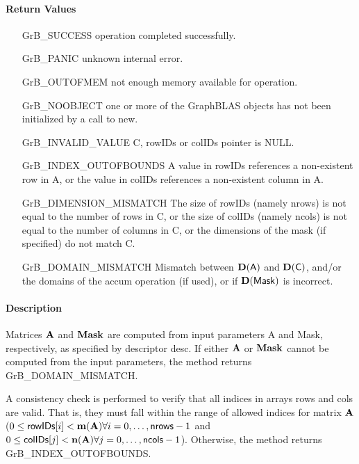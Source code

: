 \paragraph{Return Values}

\begin{itemize}[leftmargin=2.1in]
\item[{\sf GrB\_SUCCESS}]     operation completed successfully.
\item[{\sf GrB\_PANIC}]        unknown internal error.
\item[{\sf GrB\_OUTOFMEM}]    not enough memory available for operation.
\item[{\sf GrB\_NOOBJECT}]   one or more of the GraphBLAS objects has
                             not been initialized by a call to {\sf new}.
\item[{\sf GrB\_INVALID\_VALUE}]    {\sf C}, {\sf rowIDs} or {\sf colIDs} pointer is {\sf NULL}.

\item[{\sf GrB\_INDEX\_OUTOFBOUNDS}]
        A value in {\sf rowIDs} references a non-existent row in {\sf A}, or
        the value in {\sf colIDs} references a non-existent column in {\sf A}.
\item[{\sf GrB\_DIMENSION\_MISMATCH}] 
        The size of {\sf rowIDs} (namely {\sf nrows}) is not equal to the number of rows in {\sf C}, or
        the size of {\sf colIDs} (namely {\sf ncols}) is not equal to the number of columns in {\sf C}, or
        the dimensions of the mask (if specified) do not match {\sf C}.
\item[{\sf GrB\_DOMAIN\_MISMATCH}]    Mismatch between $\bold{D}({\sf A})$ and $\bold{D}({\sf C})$, 
                                      and/or the domains of the 
                                      {\sf accum} operation (if used), or if $\bold{D}(\sf Mask)$ is incorrect.
\end{itemize}


\paragraph{Description}

Matrices ${\bf A}$ and ${\bf Mask}$ are computed from input
parameters {\sf A} and {\sf Mask}, respectively, as specified by
descriptor {\sf desc}.  If either ${\bf A}$ or ${\bf Mask}$
cannot be computed from the input parameters, the method returns {\sf
GrB\_DOMAIN\_MISMATCH}.

A consistency check is performed to verify that all indices in arrays
{\sf rows} and {\sf cols} are valid. That is, they must fall within the range of allowed
indices for matrix ${\bf A}$ ($0 \leq {\sf rowIDs}[i] < \bold{m}({\bf A})
\forall i = 0,\ldots,{\sf nrows}-1$ and
$0 \leq {\sf colIDs}[j] < \bold{n}({\bf A}) \forall j = 0,\ldots,{\sf ncols}-1$).  Otherwise, the method returns {\sf
GrB\_INDEX\_OUTOFBOUNDS}.

